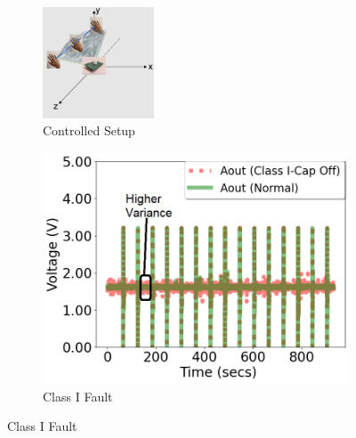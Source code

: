 \documentclass[manuscript,screen,review]{acmart} %
\providecommand{\DIFaddend}{} %
\providecommand{\DIFaddbeginFL}{} %
\providecommand{\DIFaddendFL}{} %
\providecommand{\DIFdelbeginFL}{} %
\providecommand{\DIFdelendFL}{} %
\newcommand{\DIFscaledelfig}{0.5}
\newlength{\DIFdelgraphicswidth} %
\newlength{\DIFdelgraphicsheight} %
\newcommand{\DIFaddincludegraphics}[2][]{{\color{blue}\fbox{\DIFOincludegraphics[#1]{#2}}}} %
\newcommand{\DIFdelincludegraphics}[2][]{%
\sbox{\DIFdelgraphicsbox}{\DIFOincludegraphics[#1]{#2}}%
\settoboxwidth{\DIFdelgraphicswidth}{\DIFdelgraphicsbox} %
\settoboxtotalheight{\DIFdelgraphicsheight}{\DIFdelgraphicsbox} %
\scalebox{\DIFscaledelfig}{%
\parbox[b]{\DIFdelgraphicswidth}{\usebox{\DIFdelgraphicsbox}\\[-\baselineskip] \rule{\DIFdelgraphicswidth}{0em}}\llap{\resizebox{\DIFdelgraphicswidth}{\DIFdelgraphicsheight}{%
\setlength{\unitlength}{\DIFdelgraphicswidth}%
\begin{picture}(1,1)%
\thicklines\linethickness{2pt} %
{\color[rgb]{1,0,0}\put(0,0){\framebox(1,1){}}}%
{\color[rgb]{1,0,0}\put(0,0){\line( 1,1){1}}}%
{\color[rgb]{1,0,0}\put(0,1){\line(1,-1){1}}}%
\end{picture}%
}\hspace*{3pt}}} %
} %
\DeclareRobustCommand{\DIFaddend}{\DIFOaddend \let\includegraphics\DIFOincludegraphics} %
\DeclareRobustCommand{\DIFaddbeginFL}{\DIFOaddbeginFL \let\includegraphics\DIFaddincludegraphics} %
\DeclareRobustCommand{\DIFaddendFL}{\DIFOaddendFL \let\includegraphics\DIFOincludegraphics} %
\DeclareRobustCommand{\DIFdelbeginFL}{\DIFOdelbeginFL \let\includegraphics\DIFdelincludegraphics} %
\DeclareRobustCommand{\DIFdelendFL}{\DIFOaddendFL \let\includegraphics\DIFOincludegraphics} %
\begin{document}
\DIFaddend \begin{figure}[b]
	\centering
	\DIFdelbeginFL %
\DIFdelendFL \DIFaddbeginFL \begin{subfigure}[b]{0.3\textwidth}
		\DIFaddendFL \centering
		\DIFdelbeginFL %
\DIFdelendFL \DIFaddbeginFL \includegraphics[scale=0.6, height=1.3in]{figures/platform/controlled_setup-2.png}
		\DIFaddendFL \caption{Controlled Setup}
		\label{fig:pir_sensor_controlled}
	\end{subfigure}\DIFdelbeginFL %
\DIFdelendFL \DIFaddbeginFL \begin{subfigure}[t]{0.3\textwidth}
		\DIFaddendFL \centering
		\DIFdelbeginFL %
\DIFdelendFL \DIFaddbeginFL \includegraphics[width=\textwidth]{figures/2-PIR-Fault/normal-classI/classI_compared-again.png}
		\DIFaddendFL \caption{Class I Fault}
		\label{fig:pir_sensor_controlled_a}
	\end{subfigure}\DIFdelbeginFL %


\end{figure}
\end{document}
